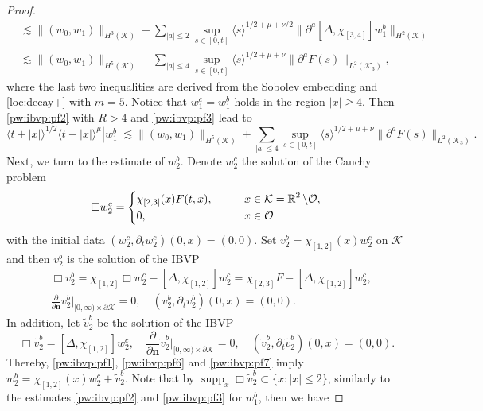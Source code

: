 \documentclass[11pt,twoside]{article}
\def\cK{\mathcal K}
\def\cO{\mathcal O}
\def\R{\mathop{\mathbb R\kern 0pt}\nolimits}
\def\supp{\mathop{\rm supp}\nolimits}
\def\p{\partial}
\def\supp{\operatorname{supp}}
\def\ls{\lesssim}
\def\bn{\mathbf{n}}
\newcommand{\w}[1]{\langle {#1} \rangle}
\theoremstyle{plain}
\theoremstyle{definition}
\numberwithin{equation}{section}
\begin{document}
\begin{proof}
\begin{equation}
\begin{split}
&\ls\|(w_0,w_1)\|_{H^3(\cK)}+\sum_{|a|\le2}\sup_{s\in[0,t]}\w{s}^{1/2+\mu+\nu/2}\|\p^a[\Delta,\chi_{[3,4]}]w_1^b\|_{H^2(\cK)}\\
&\ls\|(w_0,w_1)\|_{H^5(\cK)}+\sum_{|a|\le4}\sup_{s\in[0,t]}\w{s}^{1/2+\mu+\nu}\|\p^aF(s)\|_{L^2(\cK_3)},
\end{split}
\end{equation}
where the last two inequalities are derived from the Sobolev embedding and \eqref{loc:decay+} with $m=5$.
Notice that $w_1^c=w_1^b$ holds in the region $|x|\ge4$.
Then \eqref{pw:ibvp:pf2} with $R>4$ and \eqref{pw:ibvp:pf3} lead to
\begin{equation}\label{pw:ibvp:pf4}
\w{t+|x|}^{1/2}\w{t-|x|}^{\mu}|w_1^b|
\ls\|(w_0,w_1)\|_{H^5(\cK)}+\sum_{|a|\le4}\sup_{s\in[0,t]}\w{s}^{1/2+\mu+\nu}\|\p^aF(s)\|_{L^2(\cK_3)}.
\end{equation}
Next, we turn to the estimate of $w_2^b$.
Denote $w_2^c$ the solution of the Cauchy problem
\begin{equation}\label{pw:ibvp:pf5}
\Box w_2^c=\left\{
\begin{aligned}
&\chi_{[2,3]}(x)F(t,x), &&\qquad x\in\cK=\R^2\setminus\cO,\\
&0, &&\qquad x\in\cO
\end{aligned}
\right.
\end{equation}
with the initial data $(w_2^c,\p_tw_2^c)(0,x)=(0,0)$.
Set $v_2^b=\chi_{[1,2]}(x)w_2^c$ on $\cK$ and then $v_2^b$ is the solution of the IBVP
\begin{equation}\label{pw:ibvp:pf6}
\begin{split}
&\Box v_2^b=\chi_{[1,2]}\Box w_2^c-[\Delta,\chi_{[1,2]}]w_2^c=\chi_{[2,3]}F-[\Delta,\chi_{[1,2]}]w_2^c,\\
&\frac{\p}{\p\bn}v_2^b|_{[0,\infty)\times\p\cK}=0,\quad (v_2^b,\p_tv_2^b)(0,x)=(0,0).
\end{split}
\end{equation}
In addition, let $\tilde v_2^b$ be the solution of the IBVP
\begin{equation}\label{pw:ibvp:pf7}
\Box\tilde v_2^b=[\Delta,\chi_{[1,2]}]w_2^c,\quad \frac{\p}{\p\bn}\tilde v_2^b|_{[0,\infty)\times\p\cK}=0,\quad (\tilde v_2^b,\p_t\tilde v_2^b)(0,x)=(0,0).
\end{equation}
Thereby, \eqref{pw:ibvp:pf1}, \eqref{pw:ibvp:pf6} and \eqref{pw:ibvp:pf7} imply $w_2^b=\chi_{[1,2]}(x)w_2^c+\tilde v_2^b$.
Note that by $\supp_x\Box\tilde v_2^b\subset\{x:|x|\le2\}$, similarly to the estimates \eqref{pw:ibvp:pf2} and \eqref{pw:ibvp:pf3} for $w_1^b$,
then we have

\end{proof}
\end{document}
